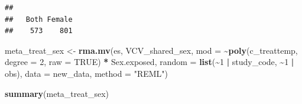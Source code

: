\documentclass[
]{article}
\newenvironment{Shaded}{\begin{snugshade}}{\end{snugshade}}
\newcommand{\AttributeTok}[1]{\textcolor[rgb]{0.13,0.29,0.53}{#1}}
\newcommand{\ConstantTok}[1]{\textcolor[rgb]{0.56,0.35,0.01}{#1}}
\newcommand{\DecValTok}[1]{\textcolor[rgb]{0.00,0.00,0.81}{#1}}
\newcommand{\FunctionTok}[1]{\textcolor[rgb]{0.13,0.29,0.53}{\textbf{#1}}}
\newcommand{\NormalTok}[1]{#1}
\newcommand{\OtherTok}[1]{\textcolor[rgb]{0.56,0.35,0.01}{#1}}
\newcommand{\SpecialCharTok}[1]{\textcolor[rgb]{0.81,0.36,0.00}{\textbf{#1}}}
\newcommand{\StringTok}[1]{\textcolor[rgb]{0.31,0.60,0.02}{#1}}
\begin{document}
\begin{Shaded}
\end{Shaded}

\begin{verbatim}
## 
##   Both Female 
##    573    801
\end{verbatim}

\begin{Shaded}
\begin{Highlighting}[]
\NormalTok{meta\_treat\_sex }\OtherTok{\textless{}{-}} \FunctionTok{rma.mv}\NormalTok{(es, VCV\_shared\_sex, }\AttributeTok{mod =} \SpecialCharTok{\textasciitilde{}}\FunctionTok{poly}\NormalTok{(c\_treattemp,}
    \AttributeTok{degree =} \DecValTok{2}\NormalTok{, }\AttributeTok{raw =} \ConstantTok{TRUE}\NormalTok{) }\SpecialCharTok{*}\NormalTok{ Sex.exposed, }\AttributeTok{random =} \FunctionTok{list}\NormalTok{(}\SpecialCharTok{\textasciitilde{}}\DecValTok{1} \SpecialCharTok{|}
\NormalTok{    study\_code, }\SpecialCharTok{\textasciitilde{}}\DecValTok{1} \SpecialCharTok{|}\NormalTok{ obs), }\AttributeTok{data =}\NormalTok{ new\_data, }\AttributeTok{method =} \StringTok{"REML"}\NormalTok{)}
\end{Highlighting}
\end{Shaded}

\begin{Shaded}
\begin{Highlighting}[]
\FunctionTok{summary}\NormalTok{(meta\_treat\_sex)}
\end{Highlighting}
\end{Shaded}
\end{document}
